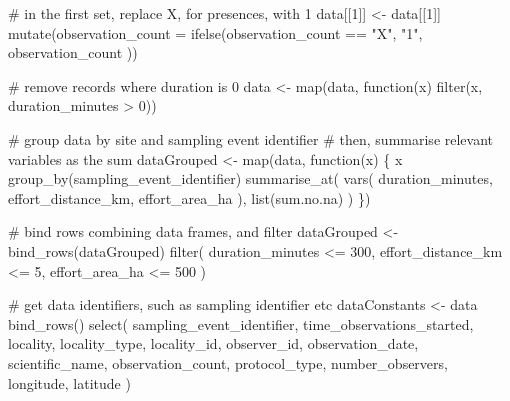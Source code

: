 \documentclass[]{article}
\newenvironment{Shaded}{}{}
\newcommand{\CommentTok}[1]{\textcolor[rgb]{0.00,0.50,0.00}{#1}}
\newcommand{\ControlFlowTok}[1]{\textcolor[rgb]{0.00,0.00,1.00}{#1}}
\newcommand{\DataTypeTok}[1]{#1}
\newcommand{\DecValTok}[1]{#1}
\newcommand{\KeywordTok}[1]{\textcolor[rgb]{0.00,0.00,1.00}{#1}}
\newcommand{\NormalTok}[1]{#1}
\newcommand{\OperatorTok}[1]{#1}
\newcommand{\StringTok}[1]{\textcolor[rgb]{0.00,0.50,0.50}{#1}}
\begin{document}
\begin{Shaded}
\begin{Highlighting}[numbers=left,,]
\CommentTok{# in the first set, replace X, for presences, with 1}
\NormalTok{data[[}\DecValTok{1}\NormalTok{]] <-}\StringTok{ }\NormalTok{data[[}\DecValTok{1}\NormalTok{]] }\OperatorTok{%
\StringTok{  }\KeywordTok{mutate}\NormalTok{(}\DataTypeTok{observation_count =} \KeywordTok{ifelse}\NormalTok{(observation_count }\OperatorTok{==}\StringTok{ "X"}\NormalTok{,}
    \StringTok{"1"}\NormalTok{, observation_count}
\NormalTok{  ))}

\CommentTok{# remove records where duration is 0}
\NormalTok{data <-}\StringTok{ }\KeywordTok{map}\NormalTok{(data, }\ControlFlowTok{function}\NormalTok{(x) }\KeywordTok{filter}\NormalTok{(x, duration_minutes }\OperatorTok{>}\StringTok{ }\DecValTok{0}\NormalTok{))}

\CommentTok{# group data by site and sampling event identifier}
\CommentTok{# then, summarise relevant variables as the sum}
\NormalTok{dataGrouped <-}\StringTok{ }\KeywordTok{map}\NormalTok{(data, }\ControlFlowTok{function}\NormalTok{(x) \{}
\NormalTok{  x }\OperatorTok{%
\StringTok{    }\KeywordTok{group_by}\NormalTok{(sampling_event_identifier) }\OperatorTok{%
\StringTok{    }\KeywordTok{summarise_at}\NormalTok{(}
      \KeywordTok{vars}\NormalTok{(}
\NormalTok{        duration_minutes, effort_distance_km,}
\NormalTok{        effort_area_ha}
\NormalTok{      ),}
      \KeywordTok{list}\NormalTok{(sum.no.na)}
\NormalTok{    )}
\NormalTok{\})}

\CommentTok{# bind rows combining data frames, and filter}
\NormalTok{dataGrouped <-}\StringTok{ }\KeywordTok{bind_rows}\NormalTok{(dataGrouped) }\OperatorTok{%
\StringTok{  }\KeywordTok{filter}\NormalTok{(}
\NormalTok{    duration_minutes }\OperatorTok{<=}\StringTok{ }\DecValTok{300}\NormalTok{,}
\NormalTok{    effort_distance_km }\OperatorTok{<=}\StringTok{ }\DecValTok{5}\NormalTok{,}
\NormalTok{    effort_area_ha }\OperatorTok{<=}\StringTok{ }\DecValTok{500}
\NormalTok{  )}

\CommentTok{# get data identifiers, such as sampling identifier etc}
\NormalTok{dataConstants <-}\StringTok{ }\NormalTok{data }\OperatorTok{%
\StringTok{  }\KeywordTok{bind_rows}\NormalTok{() }\OperatorTok{%
\StringTok{  }\KeywordTok{select}\NormalTok{(}
\NormalTok{    sampling_event_identifier, time_observations_started,}
\NormalTok{    locality, locality_type, locality_id,}
\NormalTok{    observer_id, observation_date, scientific_name,}
\NormalTok{    observation_count, protocol_type, number_observers,}
\NormalTok{    longitude, latitude}
\NormalTok{  )}

}}}}}}
\end{Highlighting}
\end{Shaded}
\end{document}
